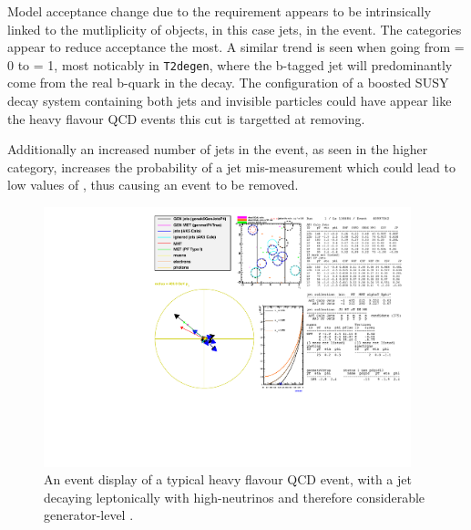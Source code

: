 Model acceptance change due to the requirement appears to be intrinsically
linked to the mutliplicity of objects, in this case jets, in the event. The
\njhigh categories appear to reduce acceptance the most. A similar trend is
seen when going from \nb = 0 to \nb = 1, most noticably in \texttt{T2degen},
where the b-tagged jet will predominantly come from the real b-quark in the
decay. The configuration of a boosted SUSY decay system containing both jets and
invisible \chiz particles could have appear like the heavy flavour QCD events
this cut is targetted at removing. 

Additionally an increased number of jets in the event, as seen in the higher \nj
category, increases the probability of a jet mis-measurement which could lead to
low values of \mindphistar, thus causing an event to be removed.

\clearpage
\begin{figure}
    \centering
    \includegraphics[width=0.95\textwidth]
    {Figs/eventDisplays/Had_QCD_MG_MC_HT375_skim_displays_singleEvent_2.pdf}
    \caption{An event display of a typical heavy flavour QCD event, with a jet
    decaying leptonically with high-\Pt neutrinos and therefore considerable
    generator-level \met.}
    \label{fig:event_display_QCD}
\end{figure}
